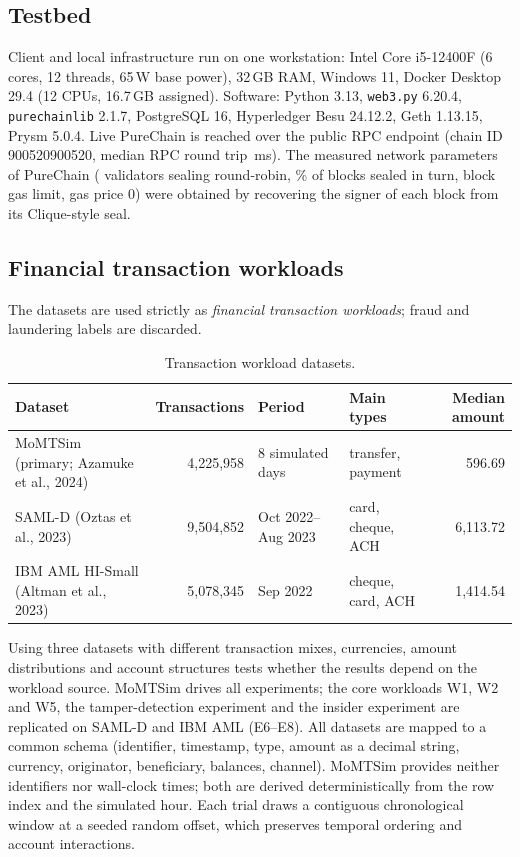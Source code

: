 \documentclass[10pt]{article}
\begin{document}
\subsection{Testbed}
Client and local infrastructure run on one workstation: Intel Core i5-12400F (6 cores, 12 threads, 65\,W base
power), 32\,GB RAM, Windows 11, Docker Desktop 29.4 (12 CPUs, 16.7\,GB assigned). Software: Python 3.13,
\texttt{web3.py} 6.20.4, \texttt{purechainlib} 2.1.7, PostgreSQL 16, Hyperledger Besu 24.12.2, Geth 1.13.15,
Prysm 5.0.4. Live PureChain is reached over the public RPC endpoint (chain ID 900520900520, median RPC round trip
\LiveRTT\,ms). The measured network parameters of PureChain (\LiveValidators{} validators sealing round-robin,
\LiveInTurn\% of blocks sealed in turn, \LiveGasLimit{} block gas limit, gas price 0) were obtained by recovering the
signer of each block from its Clique-style seal.

\subsection{Financial transaction workloads}
The datasets are used strictly as \emph{financial transaction workloads}; fraud and laundering labels are discarded.
\begin{table}[H]
\centering\scriptsize
\caption{Transaction workload datasets.}\label{tab:data}
\begin{tabular}{p{4.3cm}rllr}
\toprule
Dataset & Transactions & Period & Main types & Median amount \\
\midrule
MoMTSim (primary; Azamuke et al., 2024) & 4{,}225{,}958 & 8 simulated days & transfer, payment & 596.69 \\
SAML-D (Oztas et al., 2023) & 9{,}504{,}852 & Oct 2022--Aug 2023 & card, cheque, ACH & 6{,}113.72 \\
IBM AML HI-Small (Altman et al., 2023) & 5{,}078{,}345 & Sep 2022 & cheque, card, ACH & 1{,}414.54 \\
\bottomrule
\end{tabular}
\end{table}
\noindent Using three datasets with different transaction mixes, currencies, amount distributions and account
structures tests whether the results depend on the workload source. MoMTSim drives all experiments; the core
workloads W1, W2 and W5, the tamper-detection experiment and the insider experiment are replicated on SAML-D and IBM
AML (E6--E8). All datasets are mapped to a common schema (identifier, timestamp, type, amount as a decimal string,
currency, originator, beneficiary, balances, channel). MoMTSim provides neither identifiers nor wall-clock times; both
are derived deterministically from the row index and the simulated hour. Each trial draws a contiguous chronological
window at a seeded random offset, which preserves temporal ordering and account interactions.
\end{document}

